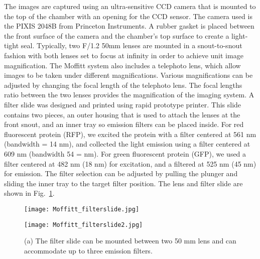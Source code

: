 The images are captured using an ultra-sensitive CCD camera that is mounted to the top of the chamber with an opening for the CCD sensor.  The camera used is the PIXIS 2048B from Princeton Instruments.  A rubber gasket is placed between the front surface of the camera and the chamber's top surface to create a light-tight seal.  Typically, two F/1.2 50mm lenses are mounted in a snout-to-snout fashion with both lenses set to focus at infinity in order to achieve unit image magnification.  The Moffitt system also includes a telephoto lens, which allow images to be taken under different magnifications.  Various magnifications can be adjusted by changing the focal length of the telephoto lens.  The focal lengths ratio between the two lenses provides the magnification of the imaging system.  A filter slide was designed and printed using rapid prototype printer.  This slide contains two pieces, an outer housing that is used to attach the lenses at the front snout, and an inner tray so emission filters can be placed inside.  For red fluorescent protein (RFP), we excited the protein with a filter centered at 561 nm (bandwidth = 14 nm), and collected the light emission using a filter centered at 609 nm (bandwidth 54 = nm).  For green fluorescent protein (GFP), we used a filter centered at 482 nm (18 nm) for excitation, and a filtered at 525 nm (45 nm) for emission.  The filter selection can be adjusted by pulling the plunger and sliding the inner tray to the target filter position.  The lens and filter slide are shown in Fig.~\ref{fig:imaging}.

\begin{figure}
	\begin{minipage}{0.4\linewidth}
	\centering
	\texttt{[image: Moffitt\_filterslide.jpg]}
	\subcaption{}
	\end{minipage}
%
	\begin{minipage}{0.4\linewidth}
	\centering
	\texttt{[image: Moffitt\_filterslide2.jpg]}
	\subcaption{}
	\end{minipage}
	\caption{(a) The filter slide can be mounted between two 50 mm lens and can accommodate up to three emission filters.}
	\label{fig:imaging}
\end{figure}


